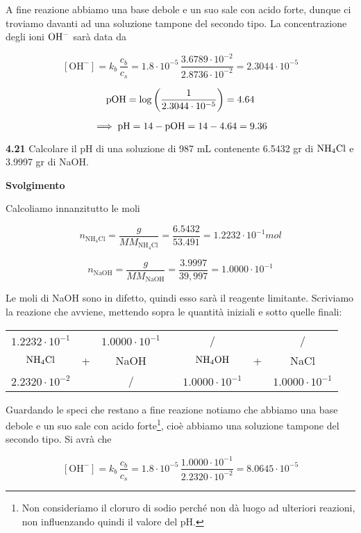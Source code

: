 A fine reazione abbiamo una base debole e un suo sale con acido forte, dunque ci troviamo davanti ad una soluzione tampone del secondo tipo. La concentrazione degli ioni $\rm OH^-$ sarà data da

$$[\text{OH}^-]=k_b\,\frac{c_b}{c_s}
=1.8 \cdot 10^{-5}\,\frac{3.6789 \cdot 10^{-2}}{2.8736 \cdot 10^{-2}}
=2.3044 \cdot 10^{-5}$$

$$\rm pOH=\log \left( \frac{1}{2.3044 \cdot 10^{-5}} \right)=4.64$$

$$\implies \rm pH=14-pOH=14-4.64=9.36$$

\vspace{0.2cm}\textbf{4.21} Calcolare il pH di una soluzione di 987 mL contenente 6.5432 gr di $\rm NH_4Cl$ e 3.9997 gr di NaOH.

\vspace{0.2cm}\large\textbf{Svolgimento}\normalsize

\vspace{0.2cm}Calcoliamo innanzitutto le moli

$$n_{\text{NH}_4\text{Cl}}=\frac{g}{MM_{\text{NH}_4\text{Cl}}}=\frac{6.5432}{53.491}=1.2232 \cdot 10^{-1} mol$$

$$n_{\text{NaOH}}=\frac{g}{MM_{\text{NaOH}}}=\frac{3.9997}{39,997}=1.0000 \cdot 10^{-1}$$

Le moli di NaOH sono in difetto, quindi esso sarà il reagente limitante. Scriviamo la reazione che avviene, mettendo sopra le quantità iniziali e sotto quelle finali:

\begin{center}
    \begin{tabular}{ccccccc}
        $1.2232 \cdot 10^{-1}$ &  & $1.0000 \cdot 10^{-1}$ & & / & & /\\
        $\rm NH_4Cl$ & + & NaOH & \ce{->} & $\rm NH_4OH$ & + & NaCl\\
        $2.2320 \cdot 10^{-2}$ &  & / & & $1.0000 \cdot 10^{-1}$ & &$1.0000 \cdot 10^{-1}$\\
    \end{tabular}
\end{center}

Guardando le speci che restano a fine reazione notiamo che abbiamo una base debole e un suo sale con acido forte\footnote{Non consideriamo il cloruro di sodio perché non dà luogo ad ulteriori reazioni, non influenzando quindi il valore del pH.}, cioè abbiamo una soluzione tampone del secondo tipo. Si avrà che

$$[\text{OH}^-]=k_b\,\frac{c_b}{c_s}
=1.8 \cdot 10^{-5}\,\frac{1.0000 \cdot 10^{-1}}{2.2320 \cdot 10^{-2}}
=8.0645 \cdot 10^{-5}$$

